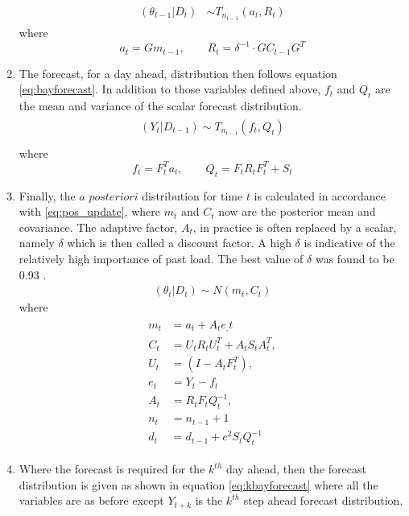 \documentclass[a4paper]{article}
\begin{document}
\begin{enumerate}
\begin{align}
\begin{split}
(\theta_{t-1}| D_t) &\sim T_{n_{t-1}}(a_t,R_t)
\end{split}
\end{align}
%
where
%
\begin{equation*}
a_t = Gm_{t-1}, \qquad R_t = \delta^{-1} \cdot GC_{t-1}G^T
\end{equation*}
%
\item The forecast, for a day ahead, distribution then follows equation \ref{eq:bayforecast}. In addition to those variables defined above, $f_t$ and $Q_t$ are the mean and variance of the scalar forecast distribution.
%
\begin{align} \label{eq:bayforecast}
\begin{split}
(Y_t | D_{t-1}) \sim T_{n_{t-1}}(f_t,Q_t) \\
\end{split}
\end{align}
%
where
%
\begin{equation*}
f_t = F^T_t a_t, \qquad Q_t = F_t R_t F_t^T + S_t
\end{equation*}
%
\item Finally, the $a$ $posteriori$ distribution for time $t$ is calculated in accordance with \ref{eq:pos_update}, where $m_t$ and $C_t$ now are the posterior mean and covariance. The adaptive factor, $A_t$, in practice is often replaced by a scalar, namely $\delta$ which is then called a discount factor. A high $\delta$ is indicative of the relatively high importance of past load. The best value of $\delta$ was found to be 0.93 \citep{douglas98}.
%
\begin{align} \label{eq:pos_update}
(\theta_t|D_t) \sim N(m_t,C_t)
\end{align}
%
where
%
\begin{align*}
\begin{split}
m_t &= a_t + A_te_,t \\
C_t &= U_t R_t U_t^T + A_t S_t A_t^T, \\
U_t &= (I - A_tF_t^T), \\ 
e_t &= Y_t - f_t \\
A_t &= R_tF_tQ_t^{-1}, \\ 
n_t &= n_{t-1} + 1\\
d_t &= d_{t-1} + e^2S_tQ_t^{-1}
\end{split}
\end{align*}
%
\item Where the forecast is required for the $k^{th}$ day ahead, then the forecast distribution is given as shown in equation \ref{eq:kbayforecast} where all the variables are as before except $Y_{t+k}$ is the $k^{th}$ step ahead forecast distribution.

\end{enumerate}
\end{document}
